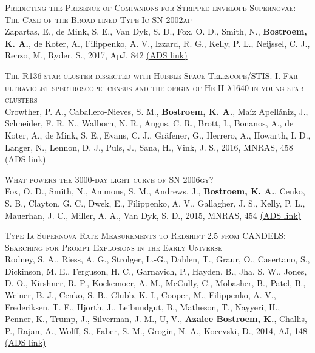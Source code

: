 \begin{revnumerate}[67]
    \item{\textsc{Predicting the Presence of Companions for Stripped-envelope Supernovae: The Case of the Broad-lined Type Ic SN 2002ap}\\ 
    Zapartas, E., de Mink, S. E., Van Dyk, S. D., Fox, O. D., Smith, N., \textbf{Bostroem, K. A.}, de Koter, A., Filippenko, A. V., Izzard, R. G., Kelly, P. L., Neijssel, C. J., Renzo, M., Ryder, S., 2017, ApJ, 842 
    \color{blue}\href{https://ui.adsabs.harvard.edu/abs/2017ApJ...842..125Z}{(ADS link)}\color{black}}\\
    
    \item{\textsc{The R136 star cluster dissected with Hubble Space Telescope/STIS. I. Far-ultraviolet spectroscopic census and the origin of He II $\lambda$1640 in young star clusters}\\ 
    Crowther, P. A., Caballero-Nieves, S. M., \textbf{Bostroem, K. A.}, Ma\'{i}z Apell\'{a}niz, J., Schneider, F. R. N., Walborn, N. R., Angus, C. R., Brott, I., Bonanos, A., de Koter, A., de Mink, S. E., Evans, C. J., Gr\"{a}fener, G., Herrero, A., Howarth, I. D., Langer, N., Lennon, D. J., Puls, J., Sana, H., Vink, J. S., 2016, MNRAS, 458 
    \color{blue}\href{https://ui.adsabs.harvard.edu/abs/2016MNRAS.458..624C}{(ADS link)}\color{black}}\\
    
    \item{\textsc{What powers the 3000-day light curve of SN 2006gy?}\\ 
    Fox, O. D., Smith, N., Ammons, S. M., Andrews, J., \textbf{Bostroem, K. A.}, Cenko, S. B., Clayton, G. C., Dwek, E., Filippenko, A. V., Gallagher, J. S., Kelly, P. L., Mauerhan, J. C., Miller, A. A., Van Dyk, S. D., 2015, MNRAS, 454 
    \color{blue}\href{https://ui.adsabs.harvard.edu/abs/2015MNRAS.454.4366F}{(ADS link)}\color{black}}\\
    
    \item{\textsc{Type Ia Supernova Rate Measurements to Redshift 2.5 from CANDELS: Searching for Prompt Explosions in the Early Universe}\\ 
    Rodney, S. A., Riess, A. G., Strolger, L.-G., Dahlen, T., Graur, O., Casertano, S., Dickinson, M. E., Ferguson, H. C., Garnavich, P., Hayden, B., Jha, S. W., Jones, D. O., Kirshner, R. P., Koekemoer, A. M., McCully, C., Mobasher, B., Patel, B., Weiner, B. J., Cenko, S. B., Clubb, K. I., Cooper, M., Filippenko, A. V., Frederiksen, T. F., Hjorth, J., Leibundgut, B., Matheson, T., Nayyeri, H., Penner, K., Trump, J., Silverman, J. M., U, V., \textbf{Azalee Bostroem, K.}, Challis, P., Rajan, A., Wolff, S., Faber, S. M., Grogin, N. A., Kocevski, D., 2014, AJ, 148 
    \color{blue}\href{https://ui.adsabs.harvard.edu/abs/2014AJ....148...13R}{(ADS link)}\color{black}}\\
    

\end{revnumerate}
